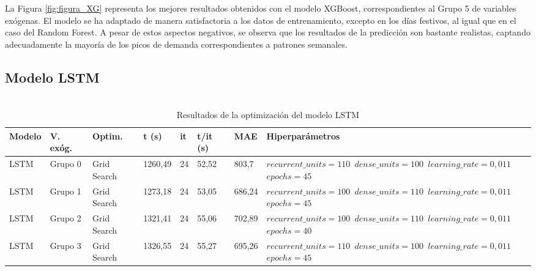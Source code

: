 \documentclass[12pt,a4paper]{report}
\begin{document}
La Figura \ref{fig:figura_XG} representa los mejores resultados obtenidos con el modelo XGBoost, correspondientes al Grupo 5 de variables exógenas. El modelo se ha adaptado de manera satisfactoria a los datos de entrenamiento, excepto en los días festivos, al igual que en el caso del Random Forest. A pesar de estos aspectos negativos, se observa que los resultados de la predicción son bastante realistas, captando adecuadamente la mayoría de los picos de demanda correspondientes a patrones semanales.

\subsection{Modelo LSTM}

\begin{table}[H]
\centering
\caption{\\ Resultados de la optimización del modelo LSTM}
\scriptsize
\begin{tabular}{m{1cm} m{1.2cm} m{1.2cm} m{1cm} m{1cm} m{1.2cm} m{1.2cm} m{3.5cm}} 
\toprule
\textbf{Modelo} & \textbf{V. exóg.} & \textbf{Optim.} & \textbf{t (s)} & \textbf{it} & \textbf{t/it (s)} & \textbf{MAE} & \textbf{Hiperparámetros} \\
\midrule
LSTM   & Grupo 0 & Grid Search & 1260,49 & 24 & 52,52 & 803,7 & \texttt{$recurrent\_units=110$ \newline $dense\_units=100$ \newline $learning\_rate=0,011$ \newline $epochs=45$} \\[0.5em]
\hline
LSTM   & Grupo 1 & Grid Search & 1273,18 & 24 & 53,05 & 686,24 & \texttt{$recurrent\_units=100$ \newline $dense\_units=110$ \newline $learning\_rate=0,011$ \newline $epochs=45$} \\[0.5em]
\hline
LSTM   & Grupo 2 & Grid Search & 1321,41 & 24 & 55,06 & 702,89 & \texttt{$recurrent\_units=100$ \newline $dense\_units=110$ \newline $learning\_rate=0,011$ \newline $epochs=40$} \\[0.5em]
\hline
LSTM   & Grupo 3 & Grid Search & 1326,55 & 24 & 55,27 & 695,26 & \texttt{$recurrent\_units=110$ \newline $dense\_units=100$ \newline $learning\_rate=0,011$ \newline $epochs=45$} \\[0.5em]

\end{tabular}
\end{table}
\end{document}
